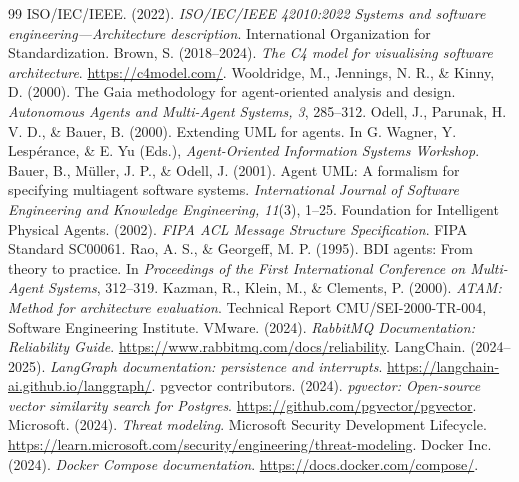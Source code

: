 \documentclass[12pt,oneside]{report}
\begin{document}
\begin{thebibliography}{99}
 ISO/IEC/IEEE. (2022). \textit{ISO/IEC/IEEE 42010:2022 Systems and software engineering---Architecture description}. International Organization for Standardization.
 Brown, S. (2018--2024). \textit{The C4 model for visualising software architecture}. \url{https://c4model.com/}.
 Wooldridge, M., Jennings, N. R., \& Kinny, D. (2000). The Gaia methodology for agent-oriented analysis and design. \textit{Autonomous Agents and Multi-Agent Systems, 3}, 285--312.
 Odell, J., Parunak, H. V. D., \& Bauer, B. (2000). Extending UML for agents. In G. Wagner, Y. Lespérance, \& E. Yu (Eds.), \textit{Agent-Oriented Information Systems Workshop}.
 Bauer, B., Müller, J. P., \& Odell, J. (2001). Agent UML: A formalism for specifying multiagent software systems. \textit{International Journal of Software Engineering and Knowledge Engineering, 11}(3), 1--25.
 Foundation for Intelligent Physical Agents. (2002). \textit{FIPA ACL Message Structure Specification}. FIPA Standard SC00061.
 Rao, A. S., \& Georgeff, M. P. (1995). BDI agents: From theory to practice. In \textit{Proceedings of the First International Conference on Multi-Agent Systems}, 312--319.
 Kazman, R., Klein, M., \& Clements, P. (2000). \textit{ATAM: Method for architecture evaluation}. Technical Report CMU/SEI-2000-TR-004, Software Engineering Institute.
 VMware. (2024). \textit{RabbitMQ Documentation: Reliability Guide}. \url{https://www.rabbitmq.com/docs/reliability}.
 LangChain. (2024--2025). \textit{LangGraph documentation: persistence and interrupts}. \url{https://langchain-ai.github.io/langgraph/}.
 pgvector contributors. (2024). \textit{pgvector: Open-source vector similarity search for Postgres}. \url{https://github.com/pgvector/pgvector}.
 Microsoft. (2024). \textit{Threat modeling}. Microsoft Security Development Lifecycle. \url{https://learn.microsoft.com/security/engineering/threat-modeling}.
 Docker Inc. (2024). \textit{Docker Compose documentation}. \url{https://docs.docker.com/compose/}.
\end{thebibliography}
\end{document}
